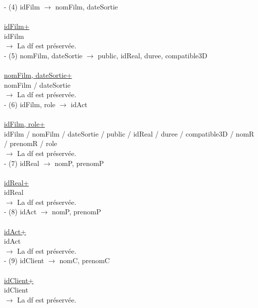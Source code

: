 \documentclass[a4paper,sffamily,12pt]{article}
\begin{document}
				\noindent - (4) idFilm $\rightarrow$ nomFilm, dateSortie \\
					\\
					\underline{idFilm+} \\
					idFilm\\								
				$\rightarrow$ La df est préservée. \\	
				
				\noindent - (5) nomFilm, dateSortie $\rightarrow$ public, idReal, duree, compatible3D \\
					\\
					\underline{nomFilm, dateSortie+} \\
					nomFilm / dateSortie \\									
				$\rightarrow$ La df est préservée. \\	
				
				\noindent - (6) idFilm, role $\rightarrow$  idAct  \\
					\\
					\underline{idFilm, role+} \\
					idFilm / nomFilm / dateSortie / public / idReal / duree / compatible3D / nomR / prenomR / role \\					
				$\rightarrow$ La df est préservée. \\
																			
				\noindent - (7) idReal $\rightarrow$ nomP, prenomP \\
					\\
					\underline{idReal+} \\
					idReal \\								
				$\rightarrow$ La df est préservée. \\	
				
				\noindent - (8) idAct $\rightarrow$ nomP, prenomP \\
					\\
					\underline{idAct+} \\
					idAct \\									
				$\rightarrow$ La df est préservée. \\	

				\noindent - (9) idClient $\rightarrow$ nomC, prenomC \\
					\\
					\underline{idClient+} \\
					idClient \\									
				$\rightarrow$ La df est préservée. \\		
\end{document}
